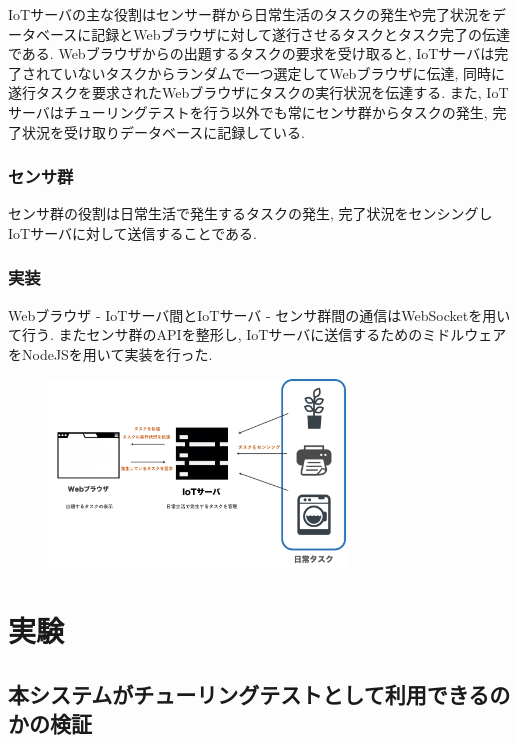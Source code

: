 IoTサーバの主な役割はセンサー群から日常生活のタスクの発生や完了状況をデータベースに記録とWebブラウザに対して遂行させるタスクとタスク完了の伝達である.
Webブラウザからの出題するタスクの要求を受け取ると,
IoTサーバは完了されていないタスクからランダムで一つ選定してWebブラウザに伝達,
同時に遂行タスクを要求されたWebブラウザにタスクの実行状況を伝達する.
また,
IoTサーバはチューリングテストを行う以外でも常にセンサ群からタスクの発生,
完了状況を受け取りデータベースに記録している.

\subsubsection{センサ群}\label{ux30bbux30f3ux30b5ux7fa4}

センサ群の役割は日常生活で発生するタスクの発生,
完了状況をセンシングしIoTサーバに対して送信することである.

\subsubsection{実装}\label{ux5b9fux88c5}

Webブラウザ - IoTサーバ間とIoTサーバ -
センサ群間の通信はWebSocketを用いて行う. またセンサ群のAPIを整形し,
IoTサーバに送信するためのミドルウェアをNodeJSを用いて実装を行った.

\begin{figure}[h]
\centering
\includegraphics[width=\textwidth,height=5cm,keepaspectratio]{images/2493299280.png}
\caption{}
\label{fig:2493299280.png}\end{figure}

\section{実験}\label{ux5b9fux9a13}

\subsection{本システムがチューリングテストとして利用できるのかの検証}\label{ux672cux30b7ux30b9ux30c6ux30e0ux304cux30c1ux30e5ux30fcux30eaux30f3ux30b0ux30c6ux30b9ux30c8ux3068ux3057ux3066ux5229ux7528ux3067ux304dux308bux306eux304bux306eux691cux8a3c}

